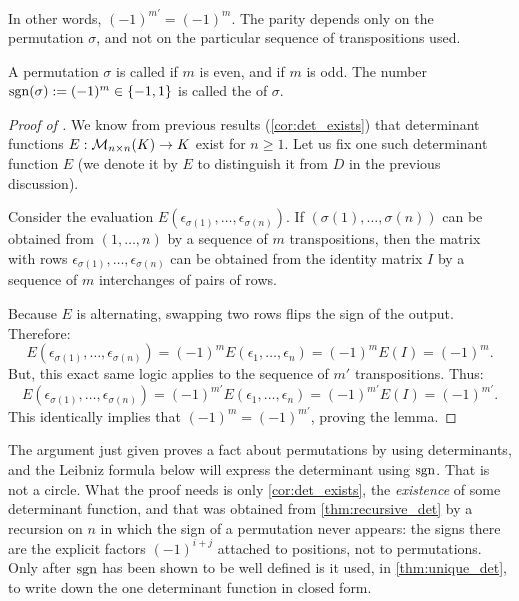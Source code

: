 In other words, $(-1)^{m'} = (-1)^m$. The parity depends only on the permutation $\sigma$, and not on the particular sequence of transpositions used.

A permutation $\sigma$ is called  if $m$ is even, and  if $m$ is odd. The number $\operatorname{sgn}(\sigma) := (-1)^m \in \{-1, 1\}$ is called the  of $\sigma$.

\begin{proof}[Proof of ]
  We know from previous results (\cref{cor:det_exists}) that determinant functions $E : \mathcal{M}_{n \times n}(K) \to K$ exist for $n \ge 1$. Let us fix one such determinant function $E$ (we denote it by $E$ to distinguish it from $D$ in the previous discussion).

  Consider the evaluation $E(\epsilon_{\sigma(1)}, \dots, \epsilon_{\sigma(n)})$. If $(\sigma(1), \dots, \sigma(n))$ can be obtained from $(1, \dots, n)$ by a sequence of $m$ transpositions, then the matrix with rows $\epsilon_{\sigma(1)}, \dots, \epsilon_{\sigma(n)}$ can be obtained from the identity matrix $I$ by a sequence of $m$ interchanges of pairs of rows.

  Because $E$ is alternating, swapping two rows flips the sign of the output. Therefore:
  \[
  E(\epsilon_{\sigma(1)}, \dots, \epsilon_{\sigma(n)}) = (-1)^m E(\epsilon_1, \dots, \epsilon_n) = (-1)^m E(I) = (-1)^m.
  \]
  But, this exact same logic applies to the sequence of $m'$ transpositions. Thus:
  \[
  E(\epsilon_{\sigma(1)}, \dots, \epsilon_{\sigma(n)}) = (-1)^{m'} E(\epsilon_1, \dots, \epsilon_n) = (-1)^{m'} E(I) = (-1)^{m'}.
  \]
  This identically implies that $(-1)^m = (-1)^{m'}$, proving the lemma.
\end{proof}

\begin{remark}
\label{rem:no_circularity_sign}
The argument just given proves a fact about permutations by using determinants, and the Leibniz formula below will express the determinant using $\operatorname{sgn}$. That is not a circle. What the proof needs is only \cref{cor:det_exists}, the \emph{existence} of some determinant function, and that was obtained from \cref{thm:recursive_det} by a recursion on $n$ in which the sign of a permutation never appears: the signs there are the explicit factors $(-1)^{i+j}$ attached to positions, not to permutations. Only after $\operatorname{sgn}$ has been shown to be well defined is it used, in \cref{thm:unique_det}, to write down the one determinant function in closed form.
\end{remark}

